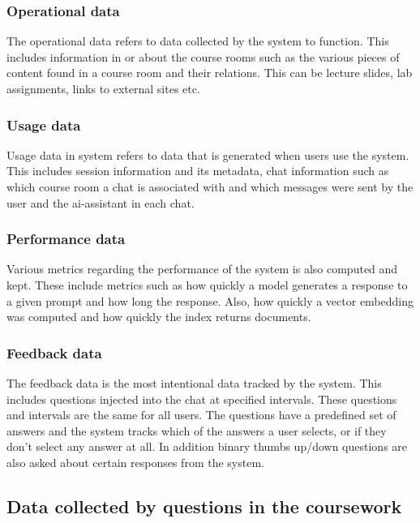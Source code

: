 \subsubsection{Operational data}


The operational data refers to data collected by the system to function. This includes information in or about the course rooms such as the various pieces of content found in a course room and their relations. This can be lecture slides, lab assignments, links to external sites etc.


\subsubsection{Usage data}


Usage data in system refers to data that is generated when users use the system. This includes session information and its metadata, chat information such as which course room a chat is associated with and which messages were sent by the user and the ai-assistant in each chat.


\subsubsection{Performance data}


Various metrics regarding the performance of the system is also computed and kept. These include metrics such as how quickly a model generates a response to a given prompt and how long the response. Also, how quickly a vector embedding was computed and how quickly the index returns documents.


\subsubsection{Feedback data}


The feedback data is the most intentional data tracked by the system. This includes questions injected into the chat at specified intervals. These questions and intervals are the same for all users. The questions have a predefined set of answers and the system tracks which of the answers a user selects, or if they don’t select any answer at all. In addition binary thumbs up/down questions are also asked about certain responses from the system.


\subsection{Data collected by questions in the coursework}

